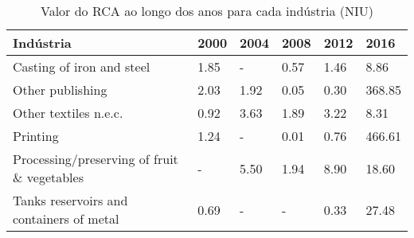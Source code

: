 \begin{table}
\centering
\caption{Valor do RCA ao longo dos anos para cada indústria (NIU)}
\label{tab:ex3-tempo-NIU}
\begin{tabular}{p{6cm}p{1.5cm}p{1.5cm}p{1.5cm}p{1.5cm}p{1.5cm}}
\toprule
                                  Indústria & 2000 & 2004 & 2008 & 2012 &   2016 \\
\midrule
                  Casting of iron and steel & 1.85 &    - & 0.57 & 1.46 &   8.86 \\
                           Other publishing & 2.03 & 1.92 & 0.05 & 0.30 & 368.85 \\
                      Other textiles n.e.c. & 0.92 & 3.63 & 1.89 & 3.22 &   8.31 \\
                                   Printing & 1.24 &    - & 0.01 & 0.76 & 466.61 \\
Processing/preserving of fruit \& vegetables &    - & 5.50 & 1.94 & 8.90 &  18.60 \\
   Tanks reservoirs and containers of metal & 0.69 &    - &    - & 0.33 &  27.48 \\
\bottomrule
\end{tabular}
\end{table}
